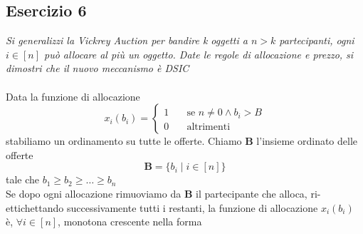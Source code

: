 \documentclass{article}
\begin{document}
        \subsection{Esercizio 6}
            \textit{Si generalizzi la Vickrey Auction per bandire k oggetti a $ n > k $ partecipanti, ogni $ i \in [n] $ può allocare al più un oggetto. Date le regole di allocazione e prezzo, si dimostri che il nuovo meccanismo è DSIC}\\
            \\
            Data la funzione di allocazione
            \[
                x_i(b_i) = \begin{cases}
                    1\quad &\text{se } n \neq 0 \wedge b_i > B \\
                    0\quad &\text{altrimenti}
                \end{cases}    
            \]
            stabiliamo un ordinamento su tutte le offerte. Chiamo \textbf{B} l'insieme ordinato delle offerte
            \[
                \textbf{B} = \{ b_i\; \vert\; i \in [n] \}    
            \]
            tale che $ b_1 \geq b_2 \geq \dots \geq b_n $\\
            Se dopo ogni allocazione rimuoviamo da \textbf{B} il partecipante che alloca, ri-ettichettando successivamente tutti i restanti, la funzione di allocazione $ x_i(b_i) $ è, $ \forall i \in [n] $, monotona crescente nella forma
            \begin{figure}[htb]\hspace*{\fill}%
                \hspace*{\fill}
            \end{figure}\\
\end{document}
